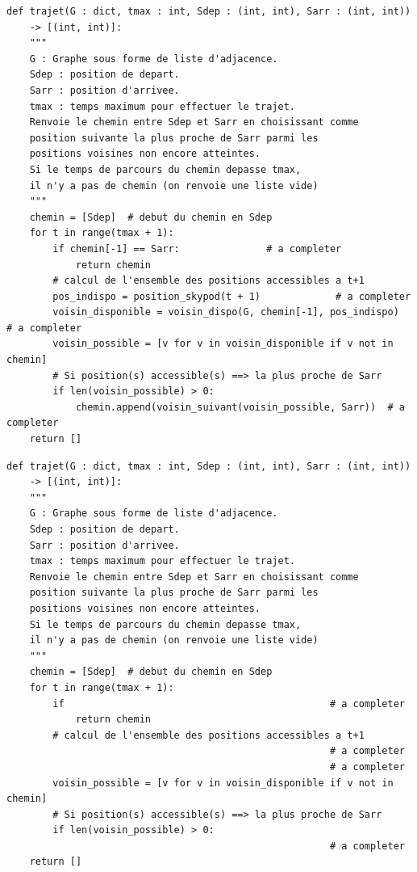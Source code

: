 

\ifcor
\begin{lstlisting}
def trajet(G : dict, tmax : int, Sdep : (int, int), Sarr : (int, int))
    -> [(int, int)]:
    """
    G : Graphe sous forme de liste d'adjacence.
    Sdep : position de depart.
    Sarr : position d'arrivee.
    tmax : temps maximum pour effectuer le trajet.
    Renvoie le chemin entre Sdep et Sarr en choisissant comme
    position suivante la plus proche de Sarr parmi les
    positions voisines non encore atteintes.
    Si le temps de parcours du chemin depasse tmax,
    il n'y a pas de chemin (on renvoie une liste vide)
    """
    chemin = [Sdep]  # debut du chemin en Sdep
    for t in range(tmax + 1):
        if chemin[-1] == Sarr:               # a completer
            return chemin
        # calcul de l'ensemble des positions accessibles a t+1
        pos_indispo = position_skypod(t + 1)             # a completer
        voisin_disponible = voisin_dispo(G, chemin[-1], pos_indispo)  # a completer
        voisin_possible = [v for v in voisin_disponible if v not in chemin]
        # Si position(s) accessible(s) ==> la plus proche de Sarr
        if len(voisin_possible) > 0:
            chemin.append(voisin_suivant(voisin_possible, Sarr))  # a completer
    return []
\end{lstlisting}
\else
\begin{lstlisting}[escapechar=@]
def trajet(G : dict, tmax : int, Sdep : (int, int), Sarr : (int, int))
    -> [(int, int)]:
    """
    G : Graphe sous forme de liste d'adjacence.
    Sdep : position de depart.
    Sarr : position d'arrivee.
    tmax : temps maximum pour effectuer le trajet.
    Renvoie le chemin entre Sdep et Sarr en choisissant comme
    position suivante la plus proche de Sarr parmi les
    positions voisines non encore atteintes.
    Si le temps de parcours du chemin depasse tmax,
    il n'y a pas de chemin (on renvoie une liste vide)
    """
    chemin = [Sdep]  # debut du chemin en Sdep
    for t in range(tmax + 1):
        if                                              # a completer
            return chemin
        # calcul de l'ensemble des positions accessibles a t+1
                                                        # a completer
                                                        # a completer
        voisin_possible = [v for v in voisin_disponible if v not in chemin]
        # Si position(s) accessible(s) ==> la plus proche de Sarr
        if len(voisin_possible) > 0:
                                                        # a completer
    return []
\end{lstlisting}
\fi

